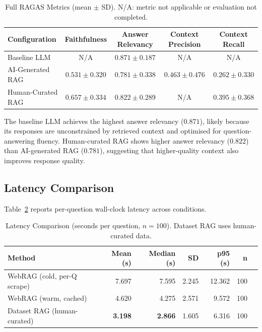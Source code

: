 \documentclass[11pt,a4paper]{article}
\begin{document}
\begin{table}[ht]
\centering
\caption{Full RAGAS Metrics (mean $\pm$ SD). N/A: metric not applicable
or evaluation not completed.}
\label{tab:ragas}
\begin{tabular}{lcccc}
\toprule
\textbf{Configuration} & \textbf{Faithfulness} & \textbf{Answer Relevancy}
  & \textbf{Context Precision} & \textbf{Context Recall} \\
\midrule
Baseline LLM        & N/A            & $0.871 \pm 0.187$ & N/A              & N/A \\
AI-Generated RAG    & $0.531 \pm 0.320$ & $0.781 \pm 0.338$ & $0.463 \pm 0.476$ & $0.262 \pm 0.330$ \\
Human-Curated RAG   & $0.657 \pm 0.334$ & $0.822 \pm 0.289$ & N/A              & $0.395 \pm 0.368$ \\
\bottomrule
\end{tabular}
\end{table}

The baseline LLM achieves the highest answer relevancy ($0.871$),
likely because its responses are unconstrained by retrieved context and
optimised for question-answering fluency.
Human-curated RAG shows higher answer relevancy ($0.822$) than
AI-generated RAG ($0.781$), suggesting that higher-quality context
also improves response quality.

\subsection{Latency Comparison}

Table~\ref{tab:latency} reports per-question wall-clock latency across conditions.

\begin{table}[ht]
\centering
\caption{Latency Comparison (seconds per question, $n=100$).
Dataset RAG uses human-curated data.}
\label{tab:latency}
\begin{tabular}{lrrrrrr}
\toprule
\textbf{Method} & \textbf{Mean (s)} & \textbf{Median (s)} & \textbf{SD}
  & \textbf{p95 (s)} & \textbf{n} \\
\midrule
WebRAG (cold, per-Q scrape) & 7.697 & 7.595 & 2.245 & 12.362 & 100 \\
WebRAG (warm, cached)       & 4.620 & 4.275 & 2.571 &  9.572 & 100 \\
Dataset RAG (human-curated) & \textbf{3.198} & \textbf{2.866} & 1.605 & 6.316 & 100 \\
\bottomrule
\end{tabular}
\end{table}
\end{document}
